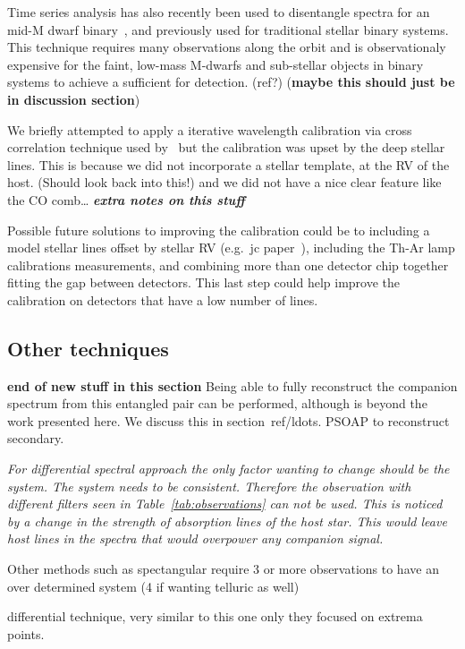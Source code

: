 Time series analysis has also recently been used to disentangle spectra for an mid-M dwarf binary~\citep{czekala_disentangling_2017}, and previously used for traditional stellar binary systems. This technique requires many observations along the orbit and is observationaly expensive for the faint, low-mass M-dwarfs and sub-stellar objects in binary systems to achieve a sufficient \snr{} for detection. (ref?) (\textbf{maybe this should just be in discussion section})



We briefly attempted to apply a iterative wavelength calibration via cross correlation technique used by~\citet{brogi_rotation_2016} but the calibration was upset by the deep stellar lines. This is because we did not incorporate a stellar template, at the {RV} of the host. (Should look back into this!) and we did not have a nice clear feature like the CO comb\ldots
\textbf{\emph{extra notes on this stuff}}

Possible future solutions to improving the calibration could be to including a model stellar lines offset by stellar {RV} (e.g.\ jc paper~\citep{piskorz_evidence_2016}), including the Th-Ar lamp calibrations measurements, and combining more than one detector chip together fitting the gap between detectors. This last step could help improve the calibration on detectors that have a low number of lines.




\subsection{Other techniques}

\textbf{end of new stuff in this section}
Being able to fully reconstruct the companion spectrum from this entangled pair can be performed, although is beyond the work presented here. We discuss this in section~ref{}/ldots. PSOAP to reconstruct secondary.

\emph{
For differential spectral approach the only factor wanting to change should be the system. The system needs to be consistent. Therefore the observation with different filters seen in Table~\ref{tab:observations} can not be used. This is noticed by a change in the strength of absorption lines of the host star. This would leave host lines in the spectra that would overpower any companion signal.}

Other methods such as spectangular require 3 or more observations to have an over determined system (4 if wanting telluric as well)


\citep{kostogryz_spectral_2013} differential technique, very similar to this one only they focused on extrema points.
